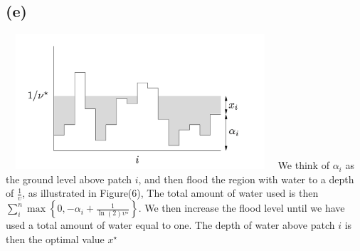 \documentclass[12pt, a4 paper]{article}
\begin{document}
\begin{framed}
        \subsection{(e)}
        {\centering
        \includegraphics[width=10cm, height=5cm]{Q9_e.png}
        }
        We think of $\alpha_{i}$ as the ground level 
        above patch $i$, and then flood the region with
        water to a depth of $\frac{1}{\upsilon}$, as illustrated
        in Figure(6), The total amount of water used is then
        $\sum_{i}^{n} \max \left\{ 0, -\alpha_{i} + 
        \frac{1}{\ln(2) \upsilon^{\star}} \right\}$. We then increase
        the flood level until we have used  a total amount of water
        equal to one. The depth of water above patch $i$ is then
        the optimal value $x^{\star}$
    \end{framed}
\end{document}
